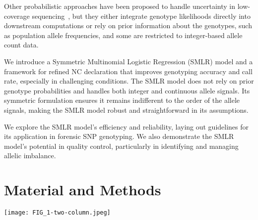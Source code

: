 \documentclass[preprint,5p,times,11pt]{elsarticle}
\begin{document}
Other probabilistic approaches have been proposed to handle uncertainty in low-coverage sequencing~\cite{mostad}, but they either integrate genotype likelihoods directly into downstream computations or rely on prior information about the genotypes, such as population allele frequencies, and some are restricted to integer-based allele count data.

We introduce a Symmetric Multinomial Logistic Regression (SMLR) model and a framework for refined NC declaration that improves genotyping accuracy and call rate, especially in challenging conditions.
The SMLR model does not rely on prior genotype probabilities and handles both integer and continuous allele signals.
Its symmetric formulation ensures it remains indifferent to the order of the allele signals, making the SMLR model robust and straightforward in its assumptions.

We explore the SMLR model's efficiency and reliability, laying out guidelines for its application in forensic SNP genotyping.
We also demonstrate the SMLR model's potential in quality control, particularly in identifying and managing allelic imbalance.



\section{Material and Methods}
\begin{figure*}
\centering
\texttt{[image: FIG\_1-two-column.jpeg]}
\caption{
Genotype predictions for the examinations of \SI{31.25}{\pg} DNA.\\
Each plot displays 1,931~SNP observations classified using the genotyping methods:
HID SNP Genotyper Plugin~(HSG), Enforcing the Quality Checks~(EQC), and Symmetric Multinomial Logistic Regression~(SMLR).
A dot represents a set of read counts $(s_1, s_2)$ for an SNP.
It is coloured by the true genotype: red for heterozygous and blue or yellow for homozygous.
Failed genotype predictions are indicated by red crosses for wrong calls and black pluses for no-calls.
In the EQC plot~(middle), the grey areas show where the HSG is guaranteed to flag for allelic imbalance.
In the SMLR plot (right), the solid lines show the decision boundaries of the SMLR model with an intercept fitted to square-root transformed allele signals. The grey area marks the no-call zone where genotype probabilities fall short of the threshold $q = 0.9937$ (an arbitrary value for illustrative purpose).
Outside the grey area, the predicted genotype has $P(G \mid s_1, s_2) \geq q$.
}
\label{fig:methods}
\end{figure*}
\end{document}

